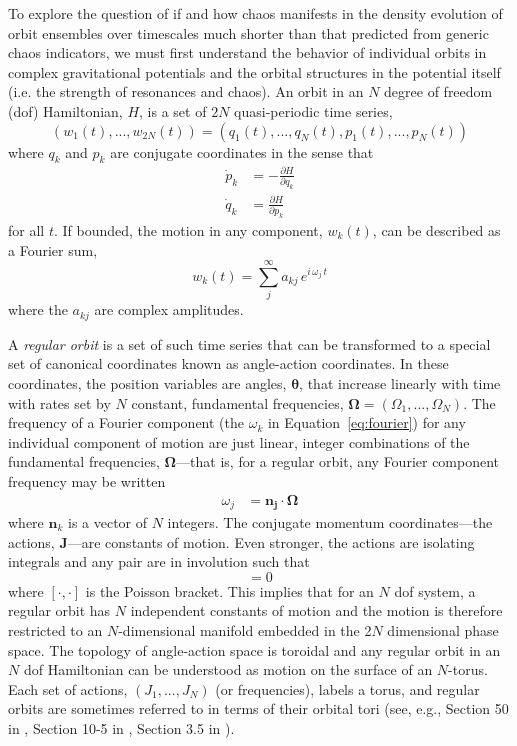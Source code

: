 To explore the question of if and how chaos manifests in the density evolution
of orbit ensembles over timescales much shorter than that predicted from generic
chaos indicators, we must first understand the behavior of individual orbits in
complex gravitational potentials and the orbital structures in the potential
itself (i.e. the strength of resonances and chaos). An orbit in an $N$ degree of
freedom (dof) Hamiltonian, $H$, is a set of $2N$ quasi-periodic time series,
\begin{equation}
(w_1(t),...,w_{2N}(t)) = (q_1(t),...,q_{N}(t),p_1(t),...,p_{N}(t)) \label{eq:coords}
\end{equation}
where $q_k$ and $p_k$ are conjugate coordinates in the sense that
\begin{align}
	\dot{p}_k &= -\frac{\partial H}{\partial q_k}\\
	\dot{q}_k &= \frac{\partial H}{\partial p_k}
\end{align}
for all $t$. If bounded, the motion in any component, $w_k(t)$, can be described as a Fourier sum,
\begin{equation}
	w_k(t) = \sum_j^\infty a_{kj} \, e^{i\,\omega_j\,t} \label{eq:fourier}
\end{equation}
where the $a_{kj}$ are complex amplitudes.

A \emph{regular orbit} is a set of such time series that can be transformed to a
special set of canonical coordinates known as angle-action coordinates. In these
coordinates, the position variables are angles, $\boldsymbol{\theta}$, that
increase linearly with time with rates set by $N$ constant, fundamental
frequencies, $\boldsymbol{\Omega} = (\Omega_1, ..., \Omega_N)$. The frequency of
a Fourier component (the $\omega_k$ in Equation~\ref{eq:fourier}) for any
individual component of motion are just linear, integer combinations of the
fundamental frequencies, $\boldsymbol{\Omega}$---that is, for a regular orbit,
any Fourier component frequency may be written
\begin{align}
	\omega_j &= \boldsymbol{n_j} \cdot \boldsymbol{\Omega} \label{eq:fourierfreq}
\end{align} %
where $\boldsymbol{n}_k$ is a vector of $N$ integers. The conjugate momentum coordinates---the actions,  $\boldsymbol{J}$---are constants of motion. Even stronger, the actions are isolating integrals and any pair are in involution such that
\begin{equation}
	[J_\alpha, J_\beta] = 0
\end{equation}
where $[\cdot,\cdot]$ is the Poisson bracket. This implies that for an $N$ dof
system, a regular orbit has $N$ independent constants of motion and the motion
is therefore restricted to an $N$-dimensional manifold embedded in the 2$N$
dimensional phase space. The topology of angle-action space is toroidal and any
regular orbit in an $N$ dof Hamiltonian can be understood as motion on the
surface of an $N$-torus. Each set of actions, $(J_1,...,J_N)$ (or frequencies),
labels a torus, and regular orbits are sometimes referred to in terms of their
orbital tori (see, e.g., Section 50 in \citealt{arnold78}, Section 10-5 in
\citealt{goldstein80}, Section 3.5 in \citealt{binneytremaine}).

